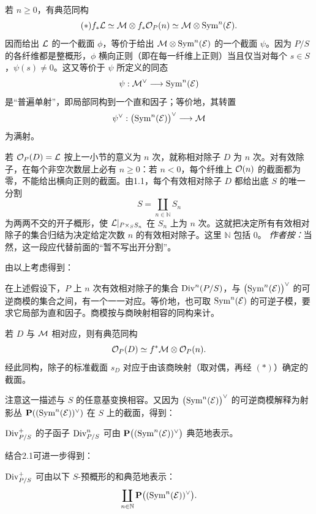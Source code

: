 若 \(n\ge0\)，有典范同构
\[
 (*)
 f_*\mathcal L \simeq \mathcal M\otimes f_*\mathcal O_P(n)
             \simeq \mathcal M\otimes\operatorname{Sym}^n(\mathcal E).
\]
因而给出 \(\mathcal L\) 的一个截面 \(\phi\)，等价于给出 \(\mathcal M\otimes\operatorname{Sym}^n(\mathcal E)\) 的一个截面 \(\psi\)。因为 \(P/S\) 的各纤维都是整概形，\(\phi\) 横向正则（即在每一纤维上正则）当且仅当对每个 \(s\in S\)，\(\psi(s)\ne0\)。这又等价于 \(\psi\) 所定义的同态
\[
 \psi:\mathcal M^\vee\longrightarrow\operatorname{Sym}^n(\mathcal E)
\]
是“普遍单射”，即局部同构到一个直和因子；等价地，其转置
\[
 \psi^\vee:\bigl(\operatorname{Sym}^n(\mathcal E)\bigr)^\vee\longrightarrow\mathcal M
\]
为满射。

若 \(\mathcal O_P(D)=\mathcal L\) 按上一小节的意义为 \(n\) 次，就称相对除子 \(D\) 为 \(n\) 次。对有效除子，在每个非空次数层上必有 \(n\ge0\)：若 \(n<0\)，每个纤维上 \(\mathcal O(n)\) 的截面都为零，不能给出横向正则的截面。由1.1，每个有效相对除子 \(D\) 都给出底 \(S\) 的唯一分割
\[
 S=\coprod_{n\in\mathbb N}S_n
\]
为两两不交的开子概形，使 \(\mathcal L|_{P\times_S S_n}\) 在 \(S_n\) 上为 \(n\) 次。这就把决定所有有效相对除子的集合归结为决定给定次数 \(n\) 的有效相对除子。这里 \(\mathbb N\) 包括 \(0\)。
\emph{作者按：}当然，这一段应代替前面的“暂不写出开分割”。

由以上考虑得到：


在上述假设下，\(P\) 上 \(n\) 次有效相对除子的集合 \(\operatorname{Div}^n(P/S)\)，与 \(\bigl(\operatorname{Sym}^n(\mathcal E)\bigr)^\vee\) 的可逆商模的集合之间，有一个一一对应。等价地，也可取 \(\operatorname{Sym}^n(\mathcal E)\) 的可逆子模，要求它局部为直和因子。商模按与商映射相容的同构来计。

若 \(D\) 与 \(\mathcal M\) 相对应，则有典范同构
\[
 \mathcal O_P(D)\simeq f^*\mathcal M\otimes\mathcal O_P(n).
\]
经此同构，除子的标准截面 \(s_D\) 对应于由该商映射（取对偶，再经 \((*)\)）确定的截面。

注意这一描述与 \(S\) 的任意基变换相容。又因为 \(\bigl(\operatorname{Sym}^n(\mathcal E)\bigr)^\vee\) 的可逆商模解释为射影丛 \(\mathbf P((\operatorname{Sym}^n(\mathcal E))^\vee)\) 在 \(S\) 上的截面，得到：


\(\operatorname{Div}^+_{P/S}\) 的子函子 \(\operatorname{Div}^n_{P/S}\) 可由
\(\mathbf P\bigl((\operatorname{Sym}^n(\mathcal E))^\vee\bigr)\) 典范地表示。

结合2.1可进一步得到：


\(\operatorname{Div}^+_{P/S}\) 可由以下 \(S\)-预概形的和典范地表示：
\[
 \coprod_{n\in\mathbb N}\mathbf P\bigl((\operatorname{Sym}^n(\mathcal E))^\vee\bigr).
\]
\par\endgroup
